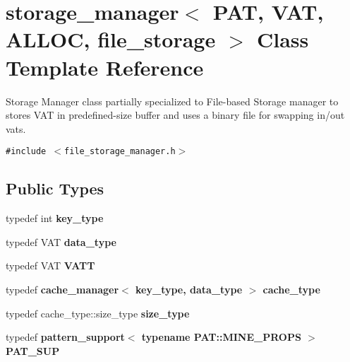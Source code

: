\section{storage\_\-manager$<$ PAT, VAT, ALLOC, file\_\-storage $>$ Class Template Reference}
\label{classstorage__manager_3_01PAT_00_01VAT_00_01ALLOC_00_01file__storage_01_4}
Storage Manager class partially specialized to File-based Storage manager to stores VAT in predefined-size buffer and uses a binary file for swapping in/out vats.  


{\tt \#include $<$file\_\-storage\_\-manager.h$>$}

\subsection*{Public Types}
\begin{CompactItemize}
\item 
typedef int \textbf{key\_\-type}\label{classstorage__manager_3_01PAT_00_01VAT_00_01ALLOC_00_01file__storage_01_4_c29c81bf9c608dc1ab418c8a4333f5b3}

\item 
typedef VAT \textbf{data\_\-type}\label{classstorage__manager_3_01PAT_00_01VAT_00_01ALLOC_00_01file__storage_01_4_7ee5796fffb5a5e57b971811635cab4f}

\item 
typedef VAT \textbf{VATT}\label{classstorage__manager_3_01PAT_00_01VAT_00_01ALLOC_00_01file__storage_01_4_0d5874f148e07f91423f2ea177365b18}

\item 
typedef \bf{cache\_\-manager}$<$ key\_\-type, data\_\-type $>$ \textbf{cache\_\-type}\label{classstorage__manager_3_01PAT_00_01VAT_00_01ALLOC_00_01file__storage_01_4_f241838d0c9b0c5a5a1dc43fa0d8fe71}

\item 
typedef cache\_\-type::size\_\-type \textbf{size\_\-type}\label{classstorage__manager_3_01PAT_00_01VAT_00_01ALLOC_00_01file__storage_01_4_772e4ea6125d80333db3e439924635ce}

\item 
typedef \bf{pattern\_\-support}$<$ typename PAT::MINE\_\-PROPS $>$ \textbf{PAT\_\-SUP}\label{classstorage__manager_3_01PAT_00_01VAT_00_01ALLOC_00_01file__storage_01_4_8247dee15eb4993e3234bc39533503f4}

\end{CompactItemize}

